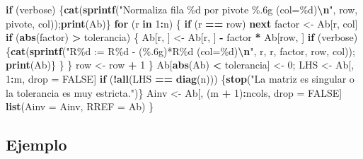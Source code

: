 \documentclass[
]{book}
\newenvironment{Shaded}{\begin{snugshade}}{\end{snugshade}}
\newcommand{\AttributeTok}[1]{\textcolor[rgb]{0.13,0.29,0.53}{#1}}
\newcommand{\ConstantTok}[1]{\textcolor[rgb]{0.56,0.35,0.01}{#1}}
\newcommand{\ControlFlowTok}[1]{\textcolor[rgb]{0.13,0.29,0.53}{\textbf{#1}}}
\newcommand{\DecValTok}[1]{\textcolor[rgb]{0.00,0.00,0.81}{#1}}
\newcommand{\FunctionTok}[1]{\textcolor[rgb]{0.13,0.29,0.53}{\textbf{#1}}}
\newcommand{\NormalTok}[1]{#1}
\newcommand{\OtherTok}[1]{\textcolor[rgb]{0.56,0.35,0.01}{#1}}
\newcommand{\SpecialCharTok}[1]{\textcolor[rgb]{0.81,0.36,0.00}{\textbf{#1}}}
\newcommand{\StringTok}[1]{\textcolor[rgb]{0.31,0.60,0.02}{#1}}
\begin{document}
\begin{Shaded}
\begin{Highlighting}[]
    \ControlFlowTok{if}\NormalTok{ (verbose) \{}\FunctionTok{cat}\NormalTok{(}\FunctionTok{sprintf}\NormalTok{(}\StringTok{"Normaliza fila \%d por pivote \%.6g (col=\%d)}\SpecialCharTok{\textbackslash{}n}\StringTok{"}\NormalTok{, row, pivote, col));}\FunctionTok{print}\NormalTok{(Ab)\}}
    \ControlFlowTok{for}\NormalTok{ (r }\ControlFlowTok{in} \DecValTok{1}\SpecialCharTok{:}\NormalTok{n) \{}
      \ControlFlowTok{if}\NormalTok{ (r }\SpecialCharTok{==}\NormalTok{ row) }\ControlFlowTok{next}
\NormalTok{      factor }\OtherTok{\textless{}{-}}\NormalTok{ Ab[r, col]}
      \ControlFlowTok{if}\NormalTok{ (}\FunctionTok{abs}\NormalTok{(factor) }\SpecialCharTok{\textgreater{}}\NormalTok{ tolerancia) \{}
\NormalTok{        Ab[r, ] }\OtherTok{\textless{}{-}}\NormalTok{ Ab[r, ] }\SpecialCharTok{{-}}\NormalTok{ factor }\SpecialCharTok{*}\NormalTok{ Ab[row, ]}
        \ControlFlowTok{if}\NormalTok{ (verbose)\{}\FunctionTok{cat}\NormalTok{(}\FunctionTok{sprintf}\NormalTok{(}\StringTok{"R\%d := R\%d {-} (\%.6g)*R\%d (col=\%d)}\SpecialCharTok{\textbackslash{}n}\StringTok{"}\NormalTok{, r, r, factor, row, col)); }\FunctionTok{print}\NormalTok{(Ab)\}}
\NormalTok{      \}}
\NormalTok{    \}}
\NormalTok{    row }\OtherTok{\textless{}{-}}\NormalTok{ row }\SpecialCharTok{+} \DecValTok{1}
\NormalTok{  \}}
\NormalTok{  Ab[}\FunctionTok{abs}\NormalTok{(Ab) }\SpecialCharTok{\textless{}}\NormalTok{ tolerancia] }\OtherTok{\textless{}{-}} \DecValTok{0}\NormalTok{;  LHS }\OtherTok{\textless{}{-}}\NormalTok{ Ab[, }\DecValTok{1}\SpecialCharTok{:}\NormalTok{m, drop }\OtherTok{=} \ConstantTok{FALSE}\NormalTok{]}
  \ControlFlowTok{if}\NormalTok{ (}\SpecialCharTok{!}\FunctionTok{all}\NormalTok{(LHS }\SpecialCharTok{==} \FunctionTok{diag}\NormalTok{(n))) \{}\FunctionTok{stop}\NormalTok{(}\StringTok{"La matriz es singular o la tolerancia es muy estricta."}\NormalTok{)\}}
\NormalTok{  Ainv }\OtherTok{\textless{}{-}}\NormalTok{ Ab[, (m }\SpecialCharTok{+} \DecValTok{1}\NormalTok{)}\SpecialCharTok{:}\NormalTok{ncols, drop }\OtherTok{=} \ConstantTok{FALSE}\NormalTok{]}
  \FunctionTok{list}\NormalTok{(}\AttributeTok{Ainv =}\NormalTok{ Ainv, }\AttributeTok{RREF =}\NormalTok{ Ab)}
\NormalTok{\}}
\end{Highlighting}
\end{Shaded}

\subsection{Ejemplo}\label{ejemplo-3}
\end{document}
